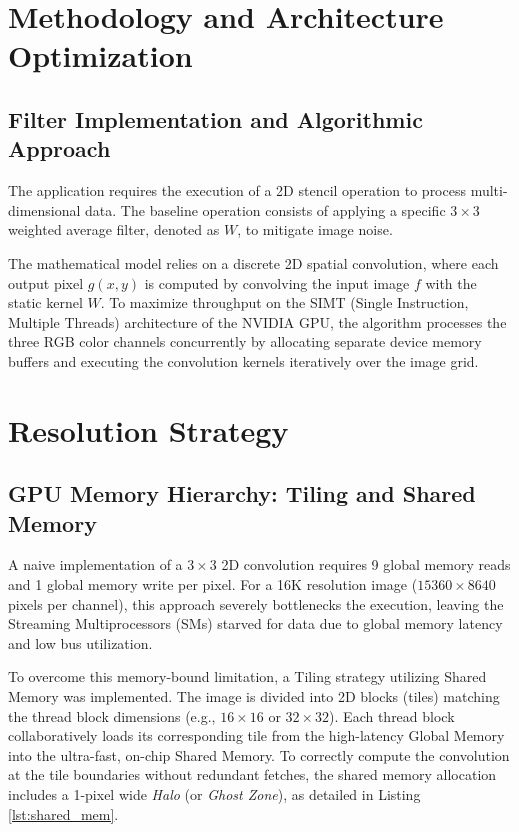 \documentclass[conference]{IEEEtran}
\numberwithin{figure}{section}
\numberwithin{table}{section}
\begin{document}
\section*{Methodology and Architecture Optimization}

\subsection*{Filter Implementation and Algorithmic Approach}
The application requires the execution of a 2D stencil operation to process multi-dimensional data. The baseline operation consists of applying a specific $3\times3$ weighted average filter, denoted as $W$, to mitigate image noise. 

The mathematical model relies on a discrete 2D spatial convolution, where each output pixel $g(x,y)$ is computed by convolving the input image $f$ with the static kernel $W$. To maximize throughput on the SIMT (Single Instruction, Multiple Threads) architecture of the NVIDIA GPU, the algorithm processes the three RGB color channels concurrently by allocating separate device memory buffers and executing the convolution kernels iteratively over the image grid.

\section*{Resolution Strategy}
\subsection*{GPU Memory Hierarchy: Tiling and Shared Memory}
A naive implementation of a $3\times3$ 2D convolution requires 9 global memory reads and 1 global memory write per pixel. For a 16K resolution image ($15360 \times 8640$ pixels per channel), this approach severely bottlenecks the execution, leaving the Streaming Multiprocessors (SMs) starved for data due to global memory latency and low bus utilization. 

To overcome this memory-bound limitation, a Tiling strategy utilizing Shared Memory was implemented. The image is divided into 2D blocks (tiles) matching the thread block dimensions (e.g., $16\times16$ or $32\times32$). Each thread block collaboratively loads its corresponding tile from the high-latency Global Memory into the ultra-fast, on-chip Shared Memory. To correctly compute the convolution at the tile boundaries without redundant fetches, the shared memory allocation includes a 1-pixel wide \textit{Halo} (or \textit{Ghost Zone}), as detailed in Listing \ref{lst:shared_mem}. 
\end{document}
